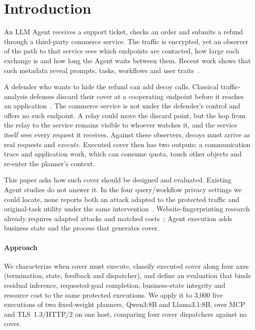 \section{Introduction}\label{sec:intro}
An LLM Agent receives a support ticket, checks an order and submits a refund through a third-party commerce service. The traffic is encrypted, yet an observer of the path to that service sees which endpoints are contacted, how large each exchange is and how long the Agent waits between them. Recent work shows that such metadata reveal prompts, tasks, workflows and user traits~\cite{jeong2026wra,dangol2026workflow,pouryousef2026traffic,li2026ant}.

A defender who wants to hide the refund can add decoy calls. Classical traffic-analysis defenses discard their cover at a cooperating endpoint before it reaches an application~\cite{apthorpe2019stp}. The commerce service is not under the defender's control and offers no such endpoint. A relay could move the discard point, but the hop from the relay to the service remains visible to whoever watches it, and the service itself sees every request it receives. Against these observers, decoys must arrive as real requests and \emph{execute}. Executed cover then has two outputs: a communication trace and application work, which can consume quota, touch other objects and re-enter the planner's context.

This paper asks how such cover should be designed and evaluated. Existing Agent studies do not answer it. In the four query/workflow privacy settings we could locate, none reports both an attack adapted to the protected traffic and original-task utility under the same intervention~\cite{jeong2026wra,dangol2026workflow}. Website-fingerprinting research already requires adapted attacks and matched costs~\cite{juarez2014critical,mathews2023critical}; Agent execution adds business state and the process that generates cover.



\paragraph{Approach}
We characterize when cover must execute, classify executed cover along four axes (termination, state, feedback and dispatcher), and define an evaluation that binds residual inference, requested-goal completion, business-state integrity and resource cost to the same protected executions. We apply it to 3,000 live executions of two fixed-weight planners, Qwen3:8B and Llama3.1:8B, over MCP and TLS~1.3/HTTP/2 on one host, comparing four cover dispatchers against no cover.

